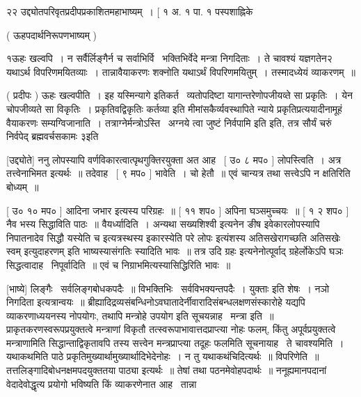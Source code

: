 \documentclass[11pt, openany]{book}
\begin{document}
२२ उद्द्योतपरिवृतप्रदीपप्रकाशितमहाभाष्यम्~। [ १ अ. १ पा. १
पस्पशाह्निके 



 ( ऊहपदार्थनिरूपणभाष्यम् ) 

 १ऊहः खल्वपि~। न सर्वैर्लिङ्गैर्न च सर्वाभिर्वि \textendash\ भक्तिभिर्वेदे मन्त्रा
निगदिताः~। ते चावश्यं यज्ञगतेन२ यथाऽर्थ विपरिणमयितव्याः~। तान्नावैयाकरणः
शक्नोति यथाऽर्थं विपरिणमयितुम्~। तस्मादध्येयं व्याकरणम्~॥ 

 ( प्रदीपः ) ऊहः खल्वपीति~। इह यस्मिन्यागे इतिकर्त \textendash\ व्यतोपदिष्टा
यागान्तरेणोपजीयव्ते सा प्रकृतिः~। येन चोपजीव्यते सा विकृतिः~। 
{\qt प्रकृतिवद्विकृतिः कर्तव्या} इति मीमांसकैर्व्यवस्थापिते न्याये
प्रकृतिप्रत्ययादीनामूहं वैयाकरणः सम्यग्विजानाति~। 
तत्राग्नेर्मन्त्रोऽस्ति \textendash\ {\qt अग्नये त्वा जुष्टं निर्वपामि} इति इति, तत्र
{\qt सौर्यं चरुं निर्वपेद् ब्रह्मवर्चसकामः} ३इति 



 [उद्द्योते] ननु लोपस्यापि वर्णविकारत्वात्पृथगुक्तिरयुक्ता अत
आह \textendash\ [ उ० ८ मप० ] लोपस्त्विति~। अत्र तत्त्वेनाभिमत इत्यर्थः~॥
तदेवाह \textendash\ [ ९ मप० ] भावेति~। चो हेतौ~॥ ए्वं चान्यत्र तथा
सत्त्वेऽपि न क्षतिरिति बोध्यम्~॥ 

 [ उ० १० मप० ] आदिना {\qt जभार} इत्यस्य परिग्रहः~॥ [ ११ शप० ]
अपिना घञ्समुच्चयः~॥ [ १ २ शप० ] नैव भस्य सिद्धाविति पाठः~॥
वैयर्ध्यादिति~। अन्यथा {\qt सख्यशिश्वी} इत्यनेन ङीष इवेकारलोपस्यापि
निपातनादेव सिद्धौ {\qt यस्येति च} इत्यत्रस्थस्य {\qt इकारस्येति परे लोपः}
इत्यंशस्य {\qt अतिसखेरागच्छति अतिसखेः स्वम् इत्युदाहरणम्} इति
भाष्यस्यासंगतिः स्यादिति {\qt भावः}~॥ तत्र {\qt उदि ग्रहः}
इत्यनेनोत्पूर्वाद् ग्रहेर्लोकेऽपि घञः सिद्धत्वादाह \textendash\ निपूर्वादिति~॥
एवं च निग्राभमित्यस्यासिद्धिरिति भावः~॥ 

 [भाष्ये] लिङ्गैः \textendash\ सर्वलिङ्गबोधकपदैः~॥
विभक्तिभिः \textendash\ सर्वविभक्यन्तपदैः~। {\qt युक्ताः} इति शेषः~। नञो निगदिता
इत्यत्रान्वयः~॥
ब्रीह्यादिद्रव्यसंबन्धिनोऽवघातादेर्नीवारादिसंबन्धलक्षणसंस्कारोहे यद्यपि
व्याकरणाध्ययनस्य नोपयोगः, तथापि मन्त्रोहे उपयोग इति सूचयन्नाह \textendash\ मन्त्रा
इति~॥ प्राकृतकरणस्वरूपप्रयुक्तत्वे मन्त्राणां विकृतौ
तत्स्वरूपाभावात्तदप्राप्त्या नोहः फलम्, किंतु अपूर्वप्रयुक्तत्वे
मन्त्राणामिति सिद्धान्ताद्विकृतावपि तस्य सत्त्वेन मन्त्रप्राप्त्या तदूहः
फलमिति सूचनायाह \textendash\ ते चावश्यमिति~। यथाकथमिति पाठे
प्रकृतिमुख्यार्थामुख्यार्थादिभेदेनोहः~। न तु यथाकथंचिदित्यर्थः~॥
विपरिणेति~॥ तत्तलिङ्गादिबोधनक्षमपदयुक्ततया पाठ्या इत्यर्थः~॥ तेषां
तथा पठनमेवोहपदार्थः~॥ ननूह्यमानपदानां वेदादेवोद्धृत्य प्रयोगो भविष्यति
किं व्याकरणेनात आह \textendash\ तान्ना \textendash\ 
\end{document}
